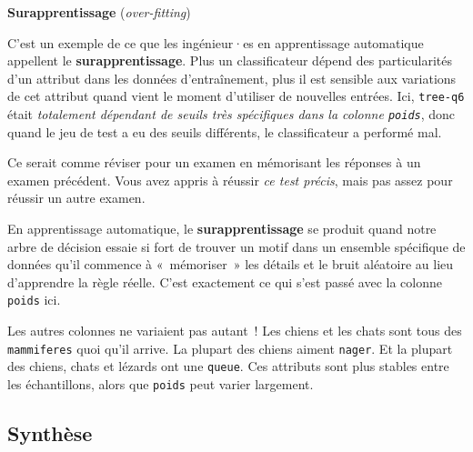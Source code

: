 \documentclass[12pt,a4paper]{article}
\begin{document}
\begin{keypointbox}
  \textbf{Surapprentissage} (\emph{over-fitting})

  C'est un exemple de ce que les ingénieur·es en apprentissage automatique appellent le \textbf{surapprentissage}. Plus un classificateur dépend des particularités d'un attribut dans les données d'entraînement, plus il est sensible aux variations de cet attribut quand vient le moment d'utiliser de nouvelles entrées. Ici, \texttt{tree-q6} était \emph{totalement dépendant de seuils très spécifiques dans la colonne \texttt{poids}}, donc quand le jeu de test a eu des seuils différents, le classificateur a performé mal.

  \vspace{0.5em}
  Ce serait comme réviser pour un examen en mémorisant les réponses à un examen précédent. Vous avez appris à réussir \emph{ce test précis}, mais pas assez pour réussir un autre examen.

  \vspace{0.5em}
  En apprentissage automatique, le \textbf{surapprentissage} se produit quand notre arbre de décision essaie si fort de trouver un motif dans un ensemble spécifique de données qu'il commence à «~mémoriser~» les détails et le bruit aléatoire au lieu d'apprendre la règle réelle. C'est exactement ce qui s'est passé avec la colonne \texttt{poids} ici.

  Les autres colonnes ne variaient pas autant~! Les chiens et les chats sont tous des \texttt{mammiferes} quoi qu'il arrive. La plupart des chiens aiment \texttt{nager}. Et la plupart des chiens, chats et lézards ont une \texttt{queue}. Ces attributs sont plus stables entre les échantillons, alors que \texttt{poids} peut varier largement.
\end{keypointbox}

\subsection{Synthèse}
\end{document}
